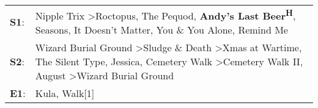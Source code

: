 \begin{supertabular}{p{0.03\textwidth}p{0.92\textwidth}}
 \textbf{S1}:  &                                                                                          Nipple Trix\textsuperscript{} \textgreater \enspace Roctopus\textsuperscript{}, \enspace The Pequod\textsuperscript{}, \enspace \textbf{Andy's Last Beer\textsuperscript{H}}, \enspace Seasons\textsuperscript{}, \enspace It Doesn't Matter\textsuperscript{}, \enspace You \& You Alone\textsuperscript{}, \enspace Remind Me\textsuperscript{}  \enspace  \\
 \textbf{S2}:  &  Wizard Burial Ground\textsuperscript{} \textgreater \enspace Sludge \& Death\textsuperscript{} \textgreater \enspace Xmas at Wartime\textsuperscript{}, \enspace The Silent Type\textsuperscript{}, \enspace Jessica\textsuperscript{}, \enspace Cemetery Walk\textsuperscript{} \textgreater \enspace Cemetery Walk II\textsuperscript{}, \enspace August\textsuperscript{} \textgreater \enspace Wizard Burial Ground\textsuperscript{}  \enspace  \\
 \textbf{E1}:  &                                                                                                                                                                                                                                                                                                                                                                                 Kula\textsuperscript{}, \enspace Walk[1]\textsuperscript{}  \enspace  \\
\end{supertabular}
